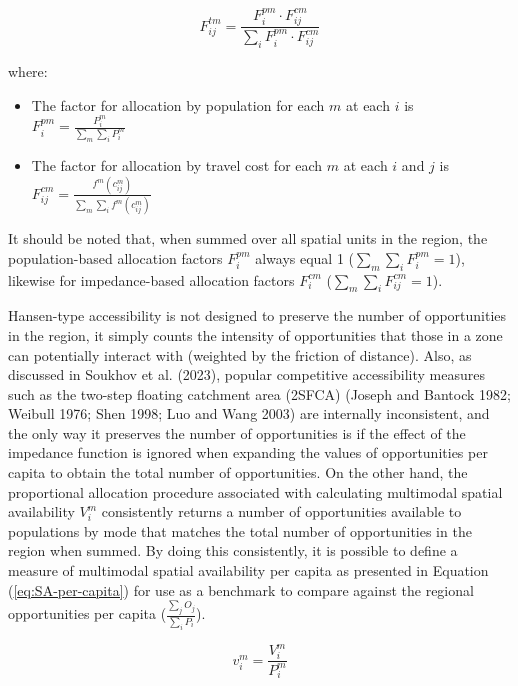 \documentclass[
default
]{sn-jnl}
\providecommand{\tightlist}{%
  \setlength{\itemsep}{0pt}\setlength{\parskip}{0pt}}\usepackage{longtable,booktabs,array}
\begin{document}
\begin{equation}
\label{eq:balancing-factors}
F^{tm}_{ij} = \frac{F^{pm}_{i} \cdot F^{cm}_{ij}}{\sum_{i} F^{pm}_{i} \cdot F^{cm}_{ij}}
\end{equation}

\noindent where:

\begin{itemize}
\tightlist
\item
  The factor for allocation by population for each \(m\) at each \(i\)
  is \(F^{pm}_{i} = \frac{P_{i}^m}{\sum_{m}\sum_{i} P_{i}^m}\)
\item
  The factor for allocation by travel cost for each \(m\) at each \(i\)
  and \(j\) is
  \(F^{cm}_{ij} = \frac{f^m(c^m_{ij})}{\sum_{m}\sum_{i} f^m(c^m_{ij})}\)
\end{itemize}

It should be noted that, when summed over all spatial units in the
region, the population-based allocation factors \(F^{pm}_{i}\) always
equal 1 (\(\sum_{m}\sum_{i} F^{pm}_{i}= 1\)), likewise for
impedance-based allocation factors \(F^{cm}_{i}\)
(\(\sum_{m}\sum_{i} F^{cm}_{ij} = 1\)).

Hansen-type accessibility is not designed to preserve the number of
opportunities in the region, it simply counts the intensity of
opportunities that those in a zone can potentially interact with
(weighted by the friction of distance). Also, as discussed in Soukhov et
al. (2023), popular competitive accessibility measures such as the
two-step floating catchment area (2SFCA) (Joseph and Bantock 1982;
Weibull 1976; Shen 1998; Luo and Wang 2003) are internally inconsistent,
and the only way it preserves the number of opportunities is if the
effect of the impedance function is ignored when expanding the values of
opportunities per capita to obtain the total number of opportunities. On
the other hand, the proportional allocation procedure associated with
calculating multimodal spatial availability \(V_i^m\) consistently
returns a number of opportunities available to populations by mode that
matches the total number of opportunities in the region when summed. By
doing this consistently, it is possible to define a measure of
multimodal spatial availability per capita as presented in Equation
(\ref{eq:SA-per-capita}) for use as a benchmark to compare against the
regional opportunities per capita
(\(\frac{\sum_{j} O_j}{\sum_{i} P_i}\)).

\begin{equation}
\label{eq:SA-per-capita}
v_i^m = \frac{V_i^m}{P_i^m}
\end{equation}
\end{document}
